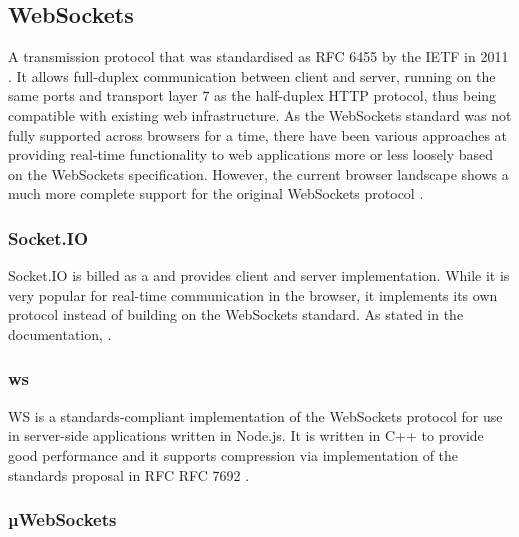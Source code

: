 \subsection{WebSockets}

A transmission protocol that was standardised as \ac{RFC} 6455 by the \ac{IETF} in 2011 \parencite{webSocketsProtocolRfc}. It allows full-duplex communication between client and server, running on the same ports and transport layer 7 as the half-duplex \ac{HTTP} protocol, thus being compatible with existing web infrastructure. As the WebSockets standard was not fully supported across browsers for a time, there have been various approaches at providing real-time functionality to web applications more or less loosely based on the WebSockets specification. However, the current browser landscape shows a much more complete support for the original WebSockets protocol \parencite{canIUseWebSockets}.



\subsubsection{Socket.IO}

Socket.IO is billed as a  and provides client and server implementation. While it is very popular for real-time communication in the browser, it implements its own protocol instead of building on the WebSockets standard. As stated in the documentation, .

\subsubsection{ws}

WS is a standards-compliant implementation of the WebSockets protocol for use in server-side applications written in Node.js. It is written in C++ to provide good performance and it supports compression via implementation of the standards proposal in \ac{RFC} RFC 7692 .

\subsubsection{µWebSockets}

